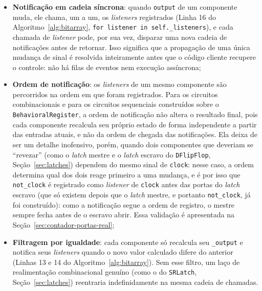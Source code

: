 \begin{itemize}
    \item \textbf{Notificação em cadeia síncrona}: quando \texttt{output} de um componente muda, ele chama, um a um, os \textit{listeners} registrados (Linha 16 do Algoritmo~\ref{alg:bitarray}, \texttt{for listener in self.\_listeners}), e cada chamada de \textit{listener} pode, por sua vez, disparar uma nova cadeia de notificações antes de retornar. Isso significa que a propagação de uma única mudança de sinal é resolvida inteiramente antes que o código cliente recupere o controle: não há filas de eventos nem execução assíncrona;
    \item \textbf{Ordem de notificação}: os \textit{listeners} de um mesmo componente são percorridos na ordem em que foram registrados. Para os circuitos combinacionais e para os circuitos sequenciais construídos sobre o \texttt{BehavioralRegister}, a ordem de notificação não altera o resultado final, pois cada componente recalcula seu próprio estado de forma independente a partir das entradas atuais, e não da ordem de chegada das notificações. Ela deixa de ser um detalhe inofensivo, porém, quando dois componentes que deveriam se ``revezar'' (como o \textit{latch} mestre e o \textit{latch} escravo do \texttt{DFlipFlop}, Seção~\ref{sec:latches}) dependem do mesmo sinal de \texttt{clock}: nesse caso, a ordem determina qual dos dois reage primeiro a uma mudança, e é por isso que \texttt{not\_clock} é registrado como \textit{listener} de \texttt{clock} antes das portas do \textit{latch} escravo (que só existem depois que o \textit{latch} mestre, e portanto \texttt{not\_clock}, já foi construído): como a notificação segue a ordem de registro, o mestre sempre fecha antes de o escravo abrir. Essa validação é apresentada na Seção~\ref{sec:contador-portas-real};
    \item \textbf{Filtragem por igualdade}: cada componente só recalcula seu \texttt{\_output} e notifica seus \textit{listeners} quando o novo valor calculado difere do anterior (Linhas 13 e 14 do Algoritmo~\ref{alg:bitarray}). Sem esse filtro, um laço de realimentação combinacional genuíno (como o do \texttt{SRLatch}, Seção~\ref{sec:latches}) reentraria indefinidamente na mesma cadeia de chamadas.
\end{itemize}

